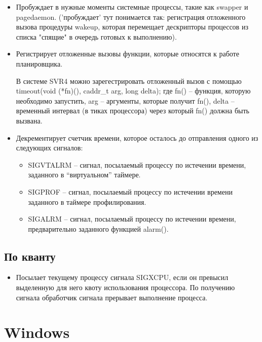 \begin{itemize}
	\item Пробуждает в нужные моменты системные процессы, такие как swapper и pagedaemon. ('пробуждает' тут понимается так: регистрация отложенного вызова процедуры wakeup, которая перемещает дескрипторы процессов из списка "спящие" в очередь готовых к выполнению).
	\item Регистрирует отложенные вызовы функции, которые относятся к работе планировщика.
	
	В системе SVR4 можно зарегестрировать отложенный вызов с помощью timeout(void (*fn)(), caddr\_t arg, long delta); где fn() -- функция, которую необходимо запустить, arg -- аргументы, которые получит fn(), delta -- временный интервал (в тиках процессора) через который fn() должна быть вызвана.
	
	\item Декрементирует счетчик времени, которое осталось до отправления одного из следующих сигналов:
	\begin{itemize}
		\item SIGVTALRM – сигнал, посылаемый процессу по истечении времени, заданного в “виртуальном” таймере.
		\item SIGPROF – сигнал, посылаемый процессу по истечении времени заданного в таймере профилирования.
		\item SIGALRM – сигнал, посылаемый процессу по истечении времени, предварительно заданного функцией alarm().
	\end{itemize}
\end{itemize}

\subsection*{По кванту}

\begin{itemize}
	\item Посылает текущему процессу сигнала SIGXCPU, если он превысил выделенную для него квоту использования процессора. По получению сигнала обработчик сигнала прерывает выполнение процесса.
\end{itemize}


\section{Windows}

